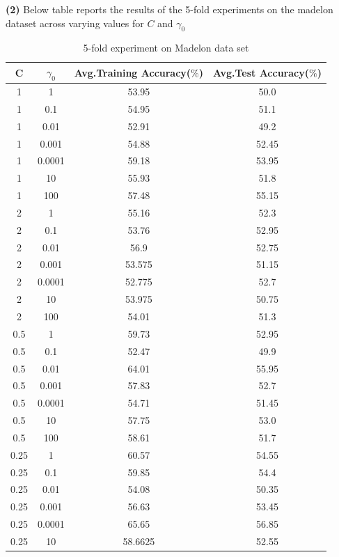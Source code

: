 \documentclass{article}
\renewcommand\part[1]{\vspace{.10in}\textbf{(#1)}}
\begin{document}
   \part{2} Below table reports the results of the 5-fold experiments on the madelon dataset across varying values for $C$ and $\gamma_0$
  
 \begin{longtable}{c|c|c|c}
  \caption{5-fold experiment on Madelon data set} \\
  \hline\hline
	  C & $\gamma_0$ & Avg.Training Accuracy($\%$) & Avg.Test Accuracy($\%$) \\[1ex]
  \hline
	  1 & 1 & 53.95 & 50.0 \\
	  1 & 0.1 & 54.95 & 51.1 \\
	  1 & 0.01 & 52.91 & 49.2 \\
	  1 & 0.001 & 54.88 & 52.45 \\
	  1 & 0.0001 & 59.18 & 53.95 \\
	  1 & 10 & 55.93 & 51.8 \\
	  1 & 100 & 57.48 & 55.15 \\
	  2 & 1 & 55.16 & 52.3 \\
	  2 & 0.1 & 53.76 & 52.95 \\
	  2 & 0.01 & 56.9 & 52.75 \\
	  2 & 0.001 & 53.575 & 51.15 \\
	  2 & 0.0001 & 52.775 & 52.7 \\
	  2 & 10 & 53.975 & 50.75 \\
	  2 & 100 & 54.01 & 51.3 \\
	  0.5 & 1 & 59.73 & 52.95 \\
	  0.5 & 0.1 & 52.47 & 49.9 \\
	  0.5 & 0.01 & 64.01 & 55.95 \\
	  0.5 & 0.001 & 57.83 & 52.7 \\
	  0.5 & 0.0001 & 54.71 & 51.45 \\
	  0.5 & 10 & 57.75 & 53.0 \\
	  0.5 & 100 & 58.61 & 51.7 \\
	  0.25 & 1 & 60.57 & 54.55 \\
	  0.25 & 0.1 & 59.85 & 54.4 \\
	  0.25 & 0.01 & 54.08 & 50.35 \\
	  0.25 & 0.001 & 56.63 & 53.45 \\
	  0.25 & 0.0001 & 65.65 & 56.85 \\
	  0.25 & 10 & 58.6625 & 52.55 \\

\end{longtable}
\end{document}
